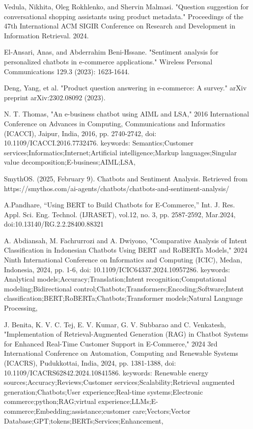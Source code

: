 \documentclass[10pt,conference]{IEEEtran}
\begin{document}
\begin{thebibliography}{99}

Vedula, Nikhita, Oleg Rokhlenko, and Shervin Malmasi. "Question suggestion for conversational shopping assistants using product metadata." Proceedings of the 47th International ACM SIGIR Conference on Research and Development in Information Retrieval. 2024.

 El-Ansari, Anas, and Abderrahim Beni-Hssane. "Sentiment analysis for personalized chatbots in e-commerce applications." Wireless Personal Communications 129.3 (2023): 1623-1644.

Deng, Yang, et al. "Product question answering in e-commerce: A survey." arXiv preprint arXiv:2302.08092 (2023).

N. T. Thomas, "An e-business chatbot using AIML and LSA," 2016 International Conference on Advances in Computing, Communications and Informatics (ICACCI), Jaipur, India, 2016, pp. 2740-2742, doi: 10.1109/ICACCI.2016.7732476. keywords: {Semantics;Customer services;Informatics;Internet;Artificial intelligence;Markup languages;Singular value decomposition;E-business;AIML;LSA},

SmythOS. (2025, February 9). Chatbots and Sentiment Analysis. Retrieved from https://smythos.com/ai-agents/chatbots/chatbots-and-sentiment-analysis/

A.Pandhare, “Using BERT to Build Chatbots for E‑Commerce,” Int. J. Res. Appl. Sci. Eng. Technol. (IJRASET), vol.12, no. 3, pp. 2587‑2592, Mar.2024, doi:10.13140/RG.2.2.28400.88321

A. Abdiansah, M. Fachrurrozi and A. Dwiyono, "Comparative Analysis of Intent Classification in Indonesian Chatbots Using BERT and RoBERTa Models," 2024 Ninth International Conference on Informatics and Computing (ICIC), Medan, Indonesia, 2024, pp. 1-6, doi: 10.1109/ICIC64337.2024.10957286. keywords: {Analytical models;Accuracy;Translation;Intent recognition;Computational modeling;Bidirectional control;Chatbots;Transformers;Encoding;Software;Intent classification;BERT;RoBERTa;Chatbots;Transformer models;Natural Language Processing},

J. Benita, K. V. C. Tej, E. V. Kumar, G. V. Subbarao and C. Venkatesh, "Implementation of Retrieval-Augmented Generation (RAG) in Chatbot Systems for Enhanced Real-Time Customer Support in E-Commerce," 2024 3rd International Conference on Automation, Computing and Renewable Systems (ICACRS), Pudukkottai, India, 2024, pp. 1381-1388, doi: 10.1109/ICACRS62842.2024.10841586. keywords: {Renewable energy sources;Accuracy;Reviews;Customer services;Scalability;Retrieval augmented generation;Chatbots;User experience;Real-time systems;Electronic commerce;python;RAG;virtual experience;LLMs;E-commerce;Embedding;assistance;customer care;Vectors;Vector Database;GPT;tokens;BERTs;Services;Enhancement},


\end{thebibliography}
\end{document}
